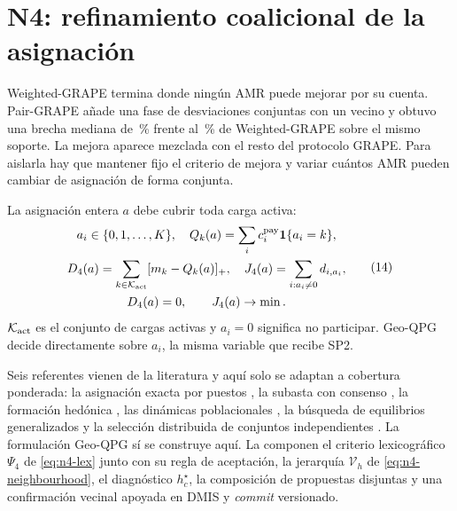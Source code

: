 \documentclass[12pt,a4paper]{article}
\theoremstyle{remark}
\theoremstyle{plain}
\begin{document}
\section{N4: refinamiento coalicional de la asignación}

Weighted-GRAPE termina donde ningún AMR puede mejorar por su cuenta. Pair-GRAPE
añade una fase de desviaciones conjuntas con un vecino y obtuvo una brecha mediana
de \NThreeCommonGapPctPair\,\% frente al \NThreeCommonGapPctGrape\,\% de
Weighted-GRAPE sobre el mismo soporte. La mejora aparece mezclada con el resto del protocolo GRAPE. Para
aislarla hay que mantener fijo el criterio de mejora y variar cuántos AMR pueden
cambiar de asignación de forma conjunta.

La asignación entera $a$ debe cubrir toda carga activa:
\begin{equation}
\label{eq:n4-common-problem}
\begin{gathered}
a_i\in\{0,1,\ldots,K\},\quad
Q_k(a)=\sum_i c_i^{\rm pay}\mathbf1\{a_i=k\},\\
D_4(a)=\sum_{k\in\mathcal K_{\rm act}}[m_k-Q_k(a)]_+,\quad
J_4(a)=\sum_{i:a_i\ne0}d_{i,a_i},\\
D_4(a)=0,\qquad J_4(a)\to\min .
\end{gathered}
\tag{14}
\end{equation}
$\mathcal K_{\rm act}$ es el conjunto de cargas activas y $a_i=0$ significa no
participar. Geo-QPG decide directamente sobre $a_i$, la misma variable que recibe
SP2.

Seis referentes vienen de la literatura y aquí solo se adaptan a cobertura
ponderada: la asignación exacta por puestos
\citep{kuhn1955Hungarian}, la subasta con consenso
\citep{choiBrunetHow2009CBBA}, la formación hedónica
\citep{jangShinTsourdos2018GRAPE}, las dinámicas poblacionales
\citep{sandholm2010population}, la búsqueda de equilibrios generalizados
\citep{yi2019operatorGNE} y la selección distribuida de conjuntos independientes
\citep{luby1986MIS}. La formulación Geo-QPG sí se construye aquí. La componen el
criterio lexicográfico $\Psi_4$ de \eqref{eq:n4-lex} junto con su regla de
aceptación, la jerarquía $\mathcal V_h$ de \eqref{eq:n4-neighbourhood}, el
diagnóstico $h_c^\star$, la composición de propuestas disjuntas y una confirmación
vecinal apoyada en DMIS y \emph{commit} versionado.
\end{document}
